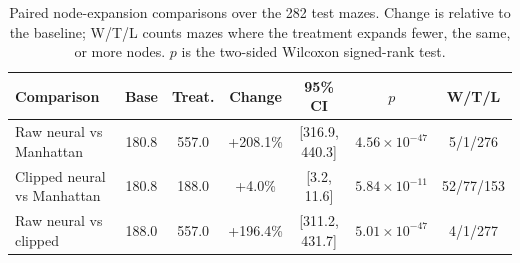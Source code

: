 \begin{table}[H]
\centering
\small
\begin{tabular}{lcccccc}
\toprule
\textbf{Comparison} & \textbf{Base} & \textbf{Treat.} & \textbf{Change} & \textbf{95\% CI} & \textbf{$p$} & \textbf{W/T/L} \\
\midrule
Raw neural vs Manhattan & 180.8 & 557.0 & +208.1\% & [316.9, 440.3] & $4.56\times10^{-47}$ & 5/1/276 \\
Clipped neural vs Manhattan & 180.8 & 188.0 & +4.0\% & [3.2, 11.6] & $5.84\times10^{-11}$ & 52/77/153 \\
Raw neural vs clipped & 188.0 & 557.0 & +196.4\% & [311.2, 431.7] & $5.01\times10^{-47}$ & 4/1/277 \\
\bottomrule
\end{tabular}
\caption{Paired node-expansion comparisons over the 282 test mazes. Change is
relative to the baseline; W/T/L counts mazes where the treatment expands fewer,
the same, or more nodes. $p$ is the two-sided Wilcoxon signed-rank test.}
\label{tab:phase5_comparison}
\end{table}
